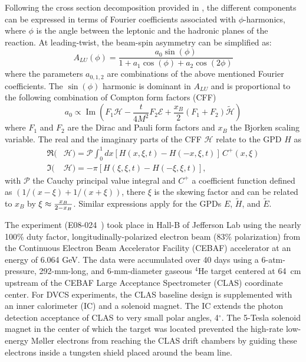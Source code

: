 \documentclass[twocolumn,nofootinbib,showpacs,prl,superscriptaddress,secnumarabic,amssymb,nobibnotes,aps,floatfix]{revtex4}
\begin{document}
Following the cross section decomposition provided in \cite{Belitsky:2001ns}, 
the different components can be expressed in terms of Fourier coefficients 
associated with $\phi$-harmonics, where $\phi$ is the angle between the 
leptonic and the hadronic planes of the reaction. At leading-twist, the 
beam-spin asymmetry can be simplified as: 
\begin{equation}
   A_{LU}(\phi) = \frac{a_{0}\sin(\phi)}{1+a_{1}\cos(\phi)+a_{2}\cos(2\phi)}
   \label{eq:alu-simp}
\end{equation}
where the parameters $a_{0,1,2}$ are combinations of the above mentioned Fourier 
coefficients. The $\sin(\phi)$ harmonic is dominant in $A_{LU}$ 
and is proportional to the following combination of Compton form factors (CFF) 
\cite{Guidal:2013rya}
\begin{equation}
   a_{0} \propto \operatorname{Im}( F_1 \mathcal{H}- \frac{t}{4M^2} F_2 
   \mathcal{E}+ \frac{x_B}{2}(F_1+F_2)\tilde{\mathcal{H}})
\end{equation}
where $F_1$ and $F_2$ are the Dirac and Pauli form factors and $x_B$ the 
Bjorken scaling variable. The real and the imaginary parts of the CFF 
$\mathcal{H}$ relate to the GPD $H$ as  
\begin{align}
   \Re(&\mathcal{H}) = \mathcal{P} \int_{0}^{1}dx[H(x,\xi,t)-H(-x,\xi,t)] \, 
   C^{+}(x,\xi) \\
   \Im(&\mathcal{H}) = - \pi [H(\xi,\xi,t)-H(-\xi,\xi,t)],
\end{align}
with $\mathcal{P}$ the Cauchy principal value integral and $C^{+}$ a 
coefficient function defined as $(1/(x-\xi) + 1/(x+\xi))$, there $\xi$ is the 
skewing factor and can be
related to $x_B$ by $\xi\approx {{x_B}\over{2-x_B}}$. Similar expressions apply 
for the GPDs $E$, $\widetilde{H}$, and $\widetilde{E}$.


The experiment (E08-024~\cite{Hafidi:2008pr}) took place in Hall-B of Jefferson 
Lab using the nearly 100\% duty factor, longitudinally-polarized electron beam 
(83$\%$ polarization) from the Continuous Electron Beam Accelerator Facility 
(CEBAF) accelerator at an energy of 6.064 GeV. The data were accumulated over 
40 days using a 6-atm-pressure, 292-mm-long, and 6-mm-diameter gaseous $^4$He 
target centered at 64~cm upstream of the CEBAF Large Acceptance Spectrometer 
(CLAS) coordinate center. For DVCS experiments, the CLAS baseline design 
\cite{Mecking:2003zu} is supplemented with an inner calorimeter (IC) and a 
solenoid magnet. The IC extends the photon detection acceptance of CLAS to very 
small polar angles, 4$^{\circ}$.  The 5-Tesla solenoid magnet in the center of 
which the target was located prevented the high-rate low-energy M{\o}ller 
electrons from reaching the CLAS drift chambers by guiding these electrons 
inside a tungsten shield placed around the beam line. 
\end{document}
